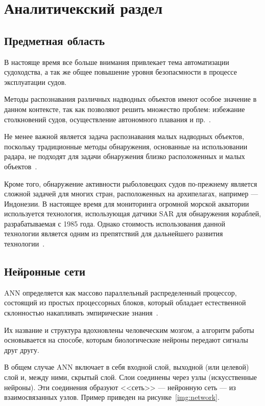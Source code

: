 \chapter{Аналитичекский раздел}

\section{Предметная область}

В настояще время все больше внимания привлекает тема автоматизации судоходства, а так же общее повышение уровня безопасмности в процессе эксплуатации судов.

Методы распознавания различных надводных объектов имеют особое значение в данном контексте, так как позволяют решить множество проблем: избежание столкновений судов, осуществление автономного плавания и пр.~\cite{ship-detection}.

Не менее важной является задача распознавания малых надводных объектов, поскольку традиционные методы обнаружения, основанные на использовании радара, не подходят для задачи обнаружения близко расположенных и малых объектов~\cite{small-ship-detection}.

Кроме того, обнаружение активности рыболовецких судов по-прежнему является сложной задачей для многих стран, расположенных на архипелагах, например --- Индонезии. В настоящее время для мониторинга огромной морской акватории используется технология, использующая датчики SAR для обнаружения кораблей, разрабатываемая с 1985 года. Однако стоимость использования данной технологии является одним из препятствий для дальнейшего развития технологии~\cite{boats-recognition}.


\section{Нейронные сети}

ANN определяется как массово параллельный распределенный процессор, состоящий из простых процессорных блоков, который обладает естественной склонностью накапливать эмпирические знания~\cite{ann}. 

Их название и структура вдохновлены человеческим мозгом, а алгоритм работы основывается на способе, которым биологические нейроны передают сигналы друг другу.

В общем случае ANN включает в себя входной слой, выходной (или целевой) слой и, между ними, скрытый слой. Слои соединены через узлы (искусственные нейроны). Эти соединения образуют <<сеть>> --- нейронную сеть --- из взаимосвязанных узлов. Пример приведен на рисунке~\ref{img:network}.

